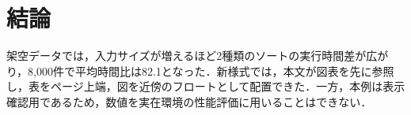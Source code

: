 \section{結論}

架空データでは，入力サイズが増えるほど2種類のソートの実行時間差が広がり，8,000件で平均時間比は82.1となった．新様式では，本文が図表を先に参照し，表をページ上端，図を近傍のフロートとして配置できた．一方，本例は表示確認用であるため，数値を実在環境の性能評価に用いることはできない．
